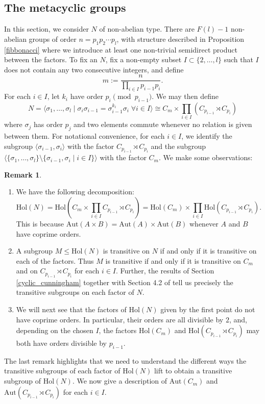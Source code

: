\documentclass[a4paper,reqno]{amsart}
\theoremstyle{definition}
\newtheorem{remark}[theorem]{Remark}
\newcommand{\Aut}{\mathrm{Aut}}
\newcommand{\Hol}{\mathrm{Hol}}
\begin{document}
\subsection{The metacyclic groups}\label{metab-cunningham}
In this section, we consider $N$ of non-abelian type. There are $F(l)-1$ non-abelian groups of order $n=p_1p_2\cdots p_l$, with structure described in Proposition \ref{fibbonacci} where we introduce at least one non-trivial semidirect product between the factors. To fix an $N$, fix a non-empty subset $I \subset \{2,\ldots,l\}$ such that $I$ does not contain any two consecutive integers, and define
\[m:=\frac{n}{\prod_{i \in I}p_{i-1}p_i}.\]
For each $i \in I$, let $k_i$ have order $p_i \pmod{p_{i-1}}$. We may then define
\[N=\langle \sigma_1,\ldots, \sigma_l \mid \sigma_i\sigma_{i-1}=\sigma_{i-1}^{k_i}\sigma_i \; \forall i \in I \rangle \cong C_m \times \prod_{i \in I}(C_{p_{i-1}} \rtimes C_{p_i})\]
where $\sigma_j$ has order $p_j$ and two elements commute whenever no relation is given between them. For notational convenience, for each $i \in I$, we identify the subgroup $\langle \sigma_{i-1},\sigma_i \rangle$ with the factor $C_{p_{i-1}} \rtimes C_{p_i}$ and the subgroup $\langle \{\sigma_1,\ldots, \sigma_l\} \setminus \{\sigma_{i-1},\sigma_i \mid i \in I\} \rangle$ with the factor $C_m$. We make some observations:
\begin{remark}\label{cunningham_metacyclic_observations}\phantom{boo}
    \begin{enumerate}[label=$\bullet$]
        \item We have the following decomposition:
        \[\Hol(N)=\Hol\left(C_m \times \prod_{i \in I}C_{p_{i-1}} \rtimes C_{p_i}\right)=\Hol(C_m) \times \prod_{i \in I} \Hol(C_{p_{i-1}}\rtimes C_{p_i}).\]
        This is because $\Aut(A \times B)=\Aut(A)\times\Aut(B)$ whenever $A$ and $B$ have coprime orders.
        \item A subgroup $M\leq\Hol(N)$ is transitive on $N$ if and only if it is transitive on each of the factors. Thus $M$ is transitive if and only if it is transitive on $C_m$ and on $C_{p_{i-1}}\rtimes C_{p_i}$ for each $i \in I$. Further, the results of Section \ref{cyclic_cunningham} together with Section 4.2 of \cite{BML21} tell us precisely the transitive subgroups on each factor of $N$.
        \item We will next see that the factors of $\Hol(N)$ given by the first point do not have coprime orders. In particular, their orders are all divisible by $2$, and, depending on the chosen $I$, the factors $\Hol(C_m)$ and $\Hol(C_{p_{i-1}}\rtimes C_{p_i})$ may both have orders divisible by $p_{i-1}$.
    \end{enumerate}
\end{remark}
The last remark highlights that we need to understand the different ways the transitive subgroups of each factor of $\Hol(N)$ lift to obtain a transitive subgroup of $\Hol(N)$. We now give a description of $\Aut(C_m)$ and $\Aut(C_{p_{i-1}}\rtimes C_{p_i})$ for each $i \in I$.
\end{document}
